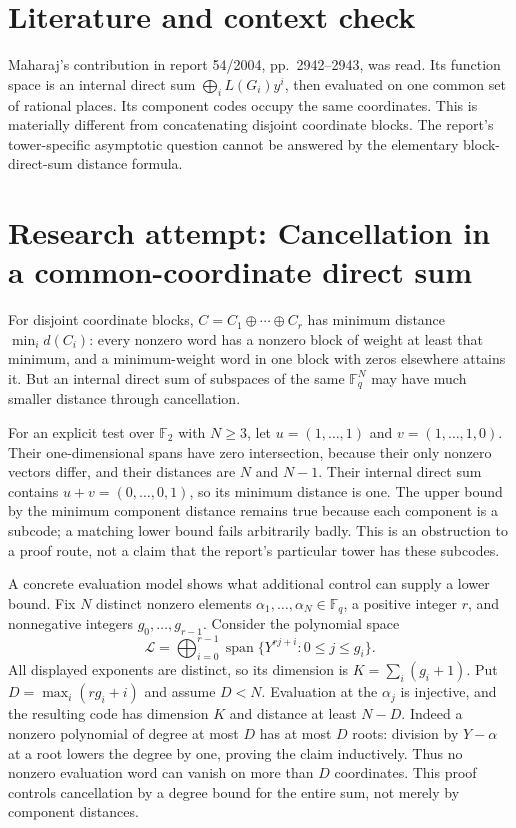 \documentclass[11pt]{article}
\begin{document}
\section{Literature and context check}
Maharaj's contribution in report 54/2004, pp.~2942--2943, was read. Its function space is an internal direct sum $\bigoplus_iL(G_i)y^i$, then evaluated on one common set of rational places. Its component codes occupy the same coordinates. This is materially different from concatenating disjoint coordinate blocks. The report's tower-specific asymptotic question cannot be answered by the elementary block-direct-sum distance formula.
\section{Research attempt: Cancellation in a common-coordinate direct sum}
For disjoint coordinate blocks, $C=C_1\oplus\cdots\oplus C_r$ has minimum distance $\min_i d(C_i)$: every nonzero word has a nonzero block of weight at least that minimum, and a minimum-weight word in one block with zeros elsewhere attains it. But an internal direct sum of subspaces of the same $\mathbb F_q^N$ may have much smaller distance through cancellation.

For an explicit test over $\mathbb F_2$ with $N\geq3$, let $u=(1,\ldots,1)$ and $v=(1,\ldots,1,0)$. Their one-dimensional spans have zero intersection, because their only nonzero vectors differ, and their distances are $N$ and $N-1$. Their internal direct sum contains $u+v=(0,\ldots,0,1)$, so its minimum distance is one. The upper bound by the minimum component distance remains true because each component is a subcode; a matching lower bound fails arbitrarily badly. This is an obstruction to a proof route, not a claim that the report's particular tower has these subcodes.

A concrete evaluation model shows what additional control can supply a lower bound. Fix $N$ distinct nonzero elements $\alpha_1,\ldots,\alpha_N\in\mathbb F_q$, a positive integer $r$, and nonnegative integers $g_0,\ldots,g_{r-1}$. Consider the polynomial space
\[
 \mathcal L=\bigoplus_{i=0}^{r-1}\operatorname{span}\{Y^{rj+i}:0\leq j\leq g_i\}.
\]
All displayed exponents are distinct, so its dimension is $K=\sum_i(g_i+1)$. Put $D=\max_i(rg_i+i)$ and assume $D<N$. Evaluation at the $\alpha_j$ is injective, and the resulting code has dimension $K$ and distance at least $N-D$. Indeed a nonzero polynomial of degree at most $D$ has at most $D$ roots: division by $Y-\alpha$ at a root lowers the degree by one, proving the claim inductively. Thus no nonzero evaluation word can vanish on more than $D$ coordinates. This proof controls cancellation by a degree bound for the entire sum, not merely by component distances.
\end{document}
